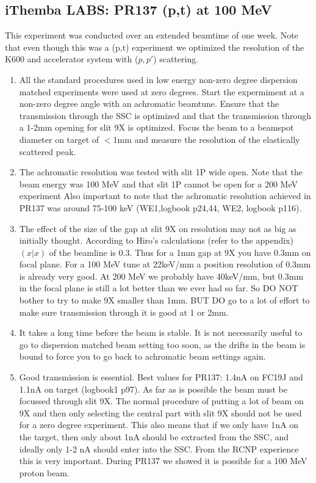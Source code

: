 \documentclass[11pt]{report}
\begin{document}
\subsection{iThemba LABS: PR137 (p,t) at 100 MeV}\label{sec:pr137}

This experiment was conducted over an extended beamtime of one week.
Note that even though this was a (p,t) experiment we optimized the resolution of the 
K600 and accelerator system with ($p,p'$) scattering.

\begin{enumerate}

\item All the standard procedures used in low energy non-zero degree dispersion matched experiments were 
used at zero degrees.
Start the expermiment at a non-zero degree angle with an achromatic beamtune. Ensure that the transmission 
through the SSC is optimized and that the transmission through a 1-2mm opening for slit 9X is optimized.  
Focus the beam to a beamspot diameter on target of $<$1mm and measure the resolution of the elastically scattered
peak.

\item The achromatic resolution was tested with slit 1P wide open. Note that the beam energy was 100 MeV 
     and that slit 1P cannot be open for a 200 MeV experiment 
     Also important to note that the achromatic resolution achieved in PR137 was around 75-100 keV
     (WE1,logbook p24,44, WE2, logbook p116).

\item The effect of the size of the gap at slit 9X on resolution may not as big as initially thought.
      According to Hiro's calculations (refer to the appendix) $(x|x)$ of the beamline is 0.3.
      Thus for a 1mm gap at 9X you have 0.3mm on focal plane. 
      For a 100 MeV tune at 22keV/mm a position resolution of 0.3mm is already very good.
      At 200 MeV we probably have 40keV/mm, but 0.3mm in the focal plane is still
      a lot better than we ever had so far.
      So DO NOT bother to try to make 9X smaller than 1mm.
      BUT DO go to a lot of effort to make sure transmission through it is good
      at 1 or 2mm.

\item It takes a long time before the beam is stable. It is not necessarily useful to go to dispersion matched
beam setting too soon, as the drifts in the beam is bound to force you to go back to achromatic beam settings
again.

\item Good transmission is essential. Best values for PR137: 1.4nA on FC19J and 1.1nA on target (logbook1 p97).
As far as is possible the beam must be focussed through slit 9X.
The normal procedure of putting a lot of beam on 9X and then only selecting the central part
with slit 9X should not be used for a zero degree experiment. This also means that if we only have 1nA on the
target, then only about 1nA should be extracted from the SSC, and ideally only 1-2 nA should enter into the SSC.
From the RCNP experience this is very important. During PR137 we showed it is possible for a 100 MeV proton beam.


\end{enumerate}
\end{document}
